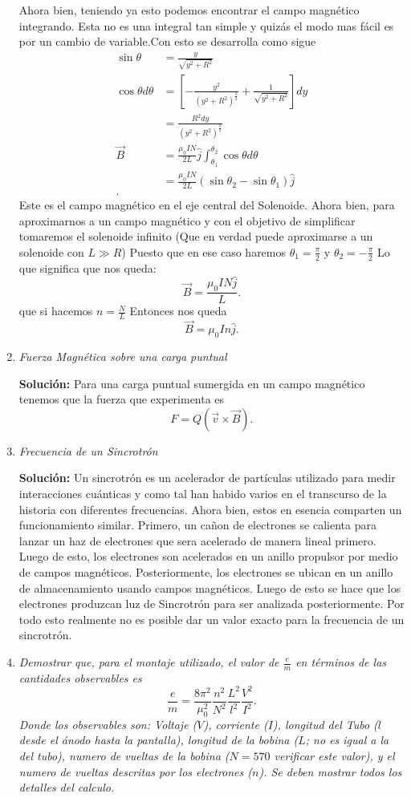 \documentclass[a4paper, amsfonts, amssymb, amsmath, reprint, showkeys, nofootinbib, twoside]{revtex4-1}
\begin{document}
\begin{enumerate}
Ahora bien, teniendo ya esto podemos encontrar el campo magnético integrando. Esta no es una integral tan simple y quizás el modo mas fácil es por un cambio de variable.Con esto se desarrolla como sigue
\begin{align*}
  \sin\theta&=\frac{y}{\sqrt{y^2+R^2} }\\
  \cos\theta d\theta&= \left[ -\frac{y^2}{\left( y^2+R^2 \right)^{\frac{3}{2}}}+\frac{1}{\sqrt{y^2+R^2} } \right] dy \\
	    &= \frac{R^2dy}{\left( y^2+R^2 \right)^{\frac{3}{2}}} \\
	    \Vec{B}&= \frac{\mu_0 IN}{2L}\hat{j}\int_{\theta_1}^{\theta_2}\cos\theta d\theta\\
	    &= \frac{\mu_0 IN}{2L}\left( \sin\theta_2 - \sin\theta_1 \right) \hat{j} \\
.\end{align*}
Este es el campo magnético en el eje central del Solenoide. Ahora bien, para aproximarnos a un campo magnético y con el objetivo de simplificar tomaremos el solenoide infinito (Que en verdad puede aproximarse a un solenoide con $L\gg R$) Puesto que en ese caso haremos $\theta_1=\frac{\pi}{2}$ y $\theta_2=-\frac{\pi}{2}$ Lo que significa que nos queda: \[
  \Vec{B}=\frac{\mu_0 IN\hat{j}}{L}
.\] que si hacemos $n=\frac{N}{L}$ Entonces nos queda \[
\Vec{B} = \mu_0 In\hat{j}
.\]\cite{OpenStaxSolenoides}
  \item \textit{Fuerza Magnética sobre una carga puntual}

    \textbf{Solución:}
    Para una carga puntual sumergida en un campo magnético tenemos que la fuerza que experimenta es \[
      F=Q(\Vec{v}\times \Vec{B})
    .\]
    \cite{KhanFuerza}
  \item \textit{Frecuencia de un Sincrotrón}

    \textbf{Solución:} 
    Un sincrotrón es un acelerador de partículas utilizado para medir interacciones cuánticas y como tal han habido varios en el transcurso de la historia con diferentes frecuencias. Ahora bien, estos en esencia comparten un funcionamiento similar. Primero, un cañon de electrones se calienta para lanzar un haz de electrones que sera acelerado de manera lineal primero. Luego de esto, los electrones son acelerados en un anillo propulsor por medio de campos magnéticos. Posteriormente, los electrones se ubican en un anillo de almacenamiento usando campos magnéticos. Luego de esto se hace que los electrones produzcan luz de Sincrotrón para ser analizada posteriormente. Por todo esto realmente no es posible dar un valor exacto para la frecuencia de un sincrotrón. \cite{Sincrotron}
  \item \textit{Demostrar que, para el montaje utilizado, el valor de $\frac{e}{m}$ en términos de las cantidades observables es \[
  \frac{e}{m}=\frac{8\pi^2}{\mu_0^2}\frac{n^2}{N^2}\frac{L^2}{l^2}\frac{V^2}{I^2}
  .\] 
Donde los observables son: Voltaje ($V$), corriente ($I$), longitud del Tubo ($l$ desde el ánodo hasta la pantalla), longitud de la bobina ($L$; no es igual a la del tubo), numero de vueltas de la bobina ($N=570$ verificar este valor), y el numero de vueltas descritas por los electrones ($n$). Se deben mostrar todos los detalles del calculo.
}


\end{enumerate}
\end{document}
